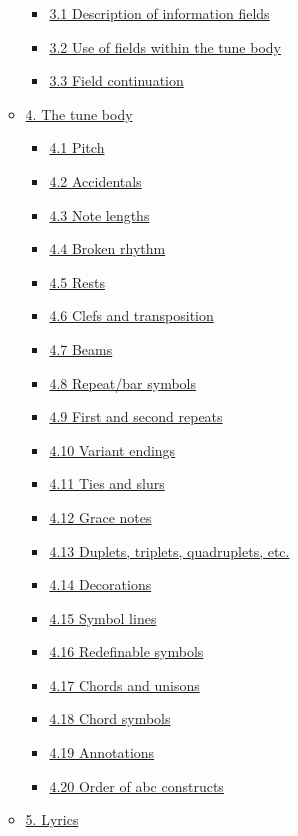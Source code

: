 \begin{itemize}
\begin{itemize}
    \begin{itemize}
    \item
      \protect\hyperlink{description_of_information_fields}{3.1
      Description of information fields}
    \item
      \protect\hyperlink{use_of_fields_within_the_tune_body}{3.2 Use of
      fields within the tune body}
    \item
      \protect\hyperlink{field_continuation}{3.3 Field continuation}
    \end{itemize}
  \item
    \protect\hyperlink{the_tune_body}{4. The tune body}

    \begin{itemize}
    \item
      \protect\hyperlink{pitch}{4.1 Pitch}
    \item
      \protect\hyperlink{accidentals}{4.2 Accidentals}
    \item
      \protect\hyperlink{note_lengths}{4.3 Note lengths}
    \item
      \protect\hyperlink{broken_rhythm}{4.4 Broken rhythm}
    \item
      \protect\hyperlink{rests}{4.5 Rests}
    \item
      \protect\hyperlink{clefs_and_transposition}{4.6 Clefs and
      transposition}
    \item
      \protect\hyperlink{beams}{4.7 Beams}
    \item
      \protect\hyperlink{repeat_bar_symbols}{4.8 Repeat/bar symbols}
    \item
      \protect\hyperlink{first_and_second_repeats}{4.9 First and second
      repeats}
    \item
      \protect\hyperlink{variant_endings}{4.10 Variant endings}
    \item
      \protect\hyperlink{ties_and_slurs}{4.11 Ties and slurs}
    \item
      \protect\hyperlink{grace_notes}{4.12 Grace notes}
    \item
      \protect\hyperlink{duplets_triplets_quadruplets_etc}{4.13 Duplets,
      triplets, quadruplets, etc.}
    \item
      \protect\hyperlink{decorations}{4.14 Decorations}
    \item
      \protect\hyperlink{symbol_lines}{4.15 Symbol lines}
    \item
      \protect\hyperlink{redefinable_symbols}{4.16 Redefinable symbols}
    \item
      \protect\hyperlink{chords_and_unisons}{4.17 Chords and unisons}
    \item
      \protect\hyperlink{chord_symbols}{4.18 Chord symbols}
    \item
      \protect\hyperlink{annotations}{4.19 Annotations}
    \item
      \protect\hyperlink{order_of_abc_constructs}{4.20 Order of abc
      constructs}
    \end{itemize}
  \item
    \protect\hyperlink{lyrics}{5. Lyrics}


\end{itemize}
\end{itemize}
